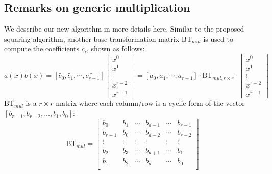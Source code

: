 \documentclass[runningheads]{llncs}
\begin{document}
\subsection{Remarks on generic multiplication}
We describe our new algorithm in more details here. Similar to the proposed squaring algorithm,
another base transformation matrix $\text{BT}_{mul}$ is used to compute the coefficients $\widetilde{c_{i}}$, shown as follows:
\[
a(x)b(x)= [\widetilde{c_{0}},\widetilde{c_{1}},\cdots,\widetilde{c_{r-1}}]\left[ \begin{array}{c}
x^{0} \\
x^{1} \\
\vdots\\
x^{r-2}\\
x^{r-1}
\end{array}
\right ]
=
[{a_{0}},{a_{1}},\cdots,{a_{r-1}}]
\cdot \text{BT}_{mul,r\times r} \cdot
\left[ \begin{array}{c}
x^{0} \\
x^{1} \\
\vdots\\
x^{r-2}\\
x^{r-1}
\end{array}
\right ]
\]
$\text{BT}_{mul}$ is a $r\times r$ matrix where each column/row is a cyclic form of the vector $[b_{r-1},b_{r-2},\ldots, b_{1},b_{0}]$:
\[
\text{BT}_{mul} =
\left[ \begin{array}{cccccc}
b_{0}&b_{1}&\cdots&b_{d-1}&\cdots &b_{r-1} \\
b_{r-1}&b_{0}&\cdots&b_{d-2}&\cdots &b_{r-2} \\
\vdots&\vdots&\vdots&\vdots&\vdots&\vdots\\
b_{2}&b_{3}&\cdots&b_{d+1}&\cdots &b_{1} \\
b_{1}&b_{2}&\cdots&b_{d}&\cdots &b_{0} \\
\end{array}
\right ]
\]
\end{document}
